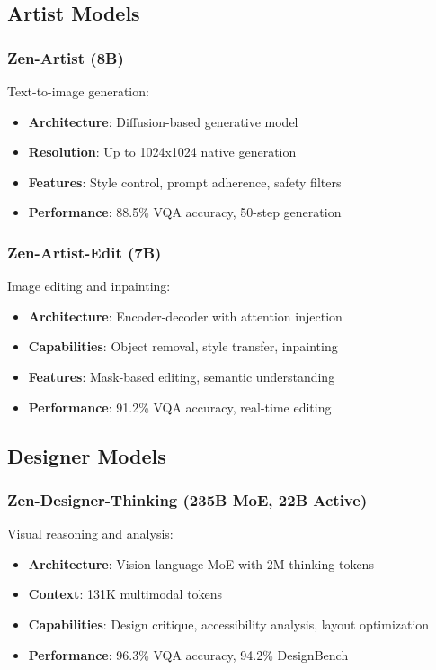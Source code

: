 \documentclass[11pt,a4paper]{article}
\begin{document}
\subsection{Artist Models}

\subsubsection{Zen-Artist (8B)}
Text-to-image generation:
\begin{itemize}
    \item \textbf{Architecture}: Diffusion-based generative model
    \item \textbf{Resolution}: Up to 1024x1024 native generation
    \item \textbf{Features}: Style control, prompt adherence, safety filters
    \item \textbf{Performance}: 88.5\% VQA accuracy, 50-step generation
\end{itemize}

\subsubsection{Zen-Artist-Edit (7B)}
Image editing and inpainting:
\begin{itemize}
    \item \textbf{Architecture}: Encoder-decoder with attention injection
    \item \textbf{Capabilities}: Object removal, style transfer, inpainting
    \item \textbf{Features}: Mask-based editing, semantic understanding
    \item \textbf{Performance}: 91.2\% VQA accuracy, real-time editing
\end{itemize}

\subsection{Designer Models}

\subsubsection{Zen-Designer-Thinking (235B MoE, 22B Active)}
Visual reasoning and analysis:
\begin{itemize}
    \item \textbf{Architecture}: Vision-language MoE with 2M thinking tokens
    \item \textbf{Context}: 131K multimodal tokens
    \item \textbf{Capabilities}: Design critique, accessibility analysis, layout optimization
    \item \textbf{Performance}: 96.3\% VQA accuracy, 94.2\% DesignBench
\end{itemize}
\end{document}
